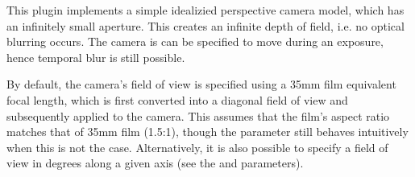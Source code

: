 
This plugin implements a simple idealizied perspective camera model, which
has an infinitely small aperture. This creates an infinite depth of field,
i.e. no optical blurring occurs. The camera is can be specified to move during
an exposure, hence temporal blur is still possible.

By default, the camera's field of view is specified using a 35mm film
equivalent focal length, which is first converted into a diagonal field
of view and subsequently applied to the camera. This assumes that
the film's aspect ratio matches that of 35mm film (1.5:1), though the
parameter still behaves intuitively when this is not the case.
Alternatively, it is also possible to specify a field of view in degrees
along a given axis (see the  and  parameters).

